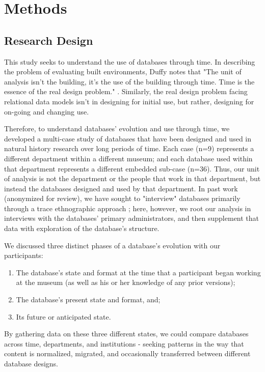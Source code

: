 \section{Methods}

\subsection{Research Design}

This study seeks to understand the use of databases through time. In describing the problem of evaluating built environments, Duffy notes that "The unit of analysis isn't the building, it's the use of the building through time. Time is the essence of the real design problem." \cite{duffy1990measuring}. Similarly, the real design problem facing relational data models isn't in designing for initial use, but rather, designing for on-going and changing use. 

Therefore, to understand databases' evolution and use through time, we developed a multi-case study of databases that have been designed and used in natural history research over long periods of time. Each case (n=9) represents a different department within a different museum; and each database used within that department represents a different embedded sub-case (n=36). Thus, our unit of analysis is not the department or the people that work in that department, but instead the databases designed and used by that department. In past work (anonymized for review), we have sought to "interview" databases primarily through a trace ethnographic approach \cite{Geiger_2011}; here, however, we root our analysis in interviews with the databases' primary administrators, and then supplement that data with exploration of the database's structure. 

We discussed three distinct phases of a database's evolution with our participants: 
\begin{enumerate}
\item The database's state and format at the time that a participant began working at the museum (as well as his or her knowledge of any prior versions); 
\item The database's present state and format, and; 
\item Its future or anticipated state. 
\end{enumerate}
By gathering data on these three different states, we could  compare databases across time, departments, and institutions - seeking patterns in the way that content is normalized, migrated, and occasionally transferred between different database designs. 

